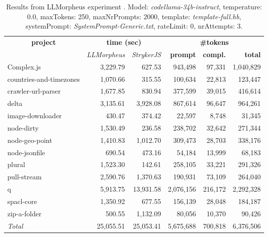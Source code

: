 
\begin{table*}[hbt!]
\centering
{\scriptsize
\begin{tabular}{l||r|r|r|r|r}
\multicolumn{1}{c|}{\bf project} & \multicolumn{2}{|c|}{\bf time (sec)} & \multicolumn{3}{|c|}{\bf \#tokens} \\
               & {\it LLMorpheus} & {\it StrykerJS} & {\bf prompt} & {\bf compl.} & {\bf total} \\
\hline
  Complex.js & 3,229.79 & 627.53 & 943,498 & 97,331 & 1,040,829 \\ 
countries-and-timezones & 1,070.66 & 315.55 & 100,634 & 22,813 & 123,447 \\ 
crawler-url-parser & 1,677.85 & 830.94 & 377,599 & 39,015 & 416,614 \\ 
delta & 3,135.61 & 3,928.08 & 867,614 & 96,647 & 964,261 \\ 
image-downloader & 430.47 & 374.42 & 22,597 & 8,748 & 31,345 \\ 
node-dirty & 1,530.49 & 236.58 & 238,702 & 32,642 & 271,344 \\ 
node-geo-point & 1,410.83 & 1,012.70 & 309,473 & 28,703 & 338,176 \\ 
node-jsonfile & 690.54 & 473.16 & 54,184 & 13,999 & 68,183 \\ 
plural & 1,523.30 & 142.61 & 258,105 & 33,221 & 291,326 \\ 
pull-stream & 2,590.76 & 1,370.63 & 190,931 & 73,109 & 264,040 \\ 
q & 5,913.75 & 13,931.58 & 2,076,156 & 216,172 & 2,292,328 \\ 
spacl-core & 1,350.92 & 677.55 & 156,139 & 28,048 & 184,187 \\ 
zip-a-folder & 500.55 & 1,132.09 & 80,056 & 10,370 & 90,426 \\ 
\hline
  \textit{Total} & 25,055.51 & 25,053.41 & 5,675,688 & 700,818 & 6,376,506 \\
  \end{tabular}
  }
  \\[2mm]
  \caption{Results from LLMorpheus experiment .
    Model: \textit{codellama-34b-instruct}, 
    temperature: 0.0, 
    maxTokens: 250, 
    maxNrPrompts: 2000, 
    template: \textit{template-full.hb}, 
    systemPrompt: \textit{SystemPrompt-Generic.txt}, 
    rateLimit: 0, 
    nrAttempts: 3.  
  }
  \label{table:Cost:run387:codellama-34b-instruct:template-full.hb:0.0}
\end{table*}